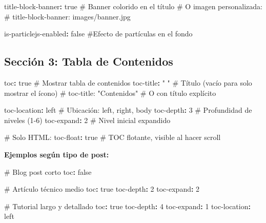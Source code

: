\documentclass[
  doc,
  floatsintext,
  longtable,
  a4paper,
  nolmodern,
  notxfonts,
  notimes,
  12pt,
  colorlinks=true,linkcolor=blue,citecolor=blue,urlcolor=blue]{apa7}
\newenvironment{Shaded}{\begin{snugshade}}{\end{snugshade}}
\newcommand{\AttributeTok}[1]{\textcolor[rgb]{0.40,0.45,0.13}{#1}}
\newcommand{\CharTok}[1]{\textcolor[rgb]{0.13,0.47,0.30}{#1}}
\newcommand{\CommentTok}[1]{\textcolor[rgb]{0.37,0.37,0.37}{#1}}
\newcommand{\DecValTok}[1]{\textcolor[rgb]{0.68,0.00,0.00}{#1}}
\newcommand{\FunctionTok}[1]{\textcolor[rgb]{0.28,0.35,0.67}{#1}}
\newcommand{\KeywordTok}[1]{\textcolor[rgb]{0.00,0.23,0.31}{\textbf{#1}}}
\newcommand{\StringTok}[1]{\textcolor[rgb]{0.13,0.47,0.30}{#1}}
\begin{document}
\begin{Shaded}
\begin{Highlighting}[]
\FunctionTok{title{-}block{-}banner}\KeywordTok{:}\AttributeTok{ }\CharTok{true}\CommentTok{     \# Banner colorido en el título}
\CommentTok{\# O imagen personalizada:}
\CommentTok{\# title{-}block{-}banner: images/banner.jpg}

\FunctionTok{is{-}particlejs{-}enabled}\KeywordTok{:}\AttributeTok{ }\CharTok{false}\CommentTok{ \#Efecto de partículas en el fondo}
\end{Highlighting}
\end{Shaded}

\subsection{Sección 3: Tabla de
Contenidos}\label{secciuxf3n-3-tabla-de-contenidos}

\begin{Shaded}
\begin{Highlighting}[]
\FunctionTok{toc}\KeywordTok{:}\AttributeTok{ }\CharTok{true}\CommentTok{                    \# Mostrar tabla de contenidos}
\FunctionTok{toc{-}title}\KeywordTok{:}\AttributeTok{ }\StringTok{" "}\CommentTok{               \# Título (vacío para solo mostrar el ícono)}
\CommentTok{\# toc{-}title: "Contenidos"    \# O con título explícito}

\FunctionTok{toc{-}location}\KeywordTok{:}\AttributeTok{ left}\CommentTok{           \# Ubicación: left, right, body}
\FunctionTok{toc{-}depth}\KeywordTok{:}\AttributeTok{ }\DecValTok{3}\CommentTok{                 \# Profundidad de niveles (1{-}6)}
\FunctionTok{toc{-}expand}\KeywordTok{:}\AttributeTok{ }\DecValTok{2}\CommentTok{                \# Nivel inicial expandido}

\CommentTok{\# Solo HTML:}
\FunctionTok{toc{-}float}\KeywordTok{:}\AttributeTok{ }\CharTok{true}\CommentTok{              \# TOC flotante, visible al hacer scroll}
\end{Highlighting}
\end{Shaded}

\textbf{Ejemplos según tipo de post:}

\begin{Shaded}
\begin{Highlighting}[]
\CommentTok{\# Blog post corto}
\FunctionTok{toc}\KeywordTok{:}\AttributeTok{ }\CharTok{false}

\CommentTok{\# Artículo técnico medio}
\FunctionTok{toc}\KeywordTok{:}\AttributeTok{ }\CharTok{true}
\FunctionTok{toc{-}depth}\KeywordTok{:}\AttributeTok{ }\DecValTok{2}
\FunctionTok{toc{-}expand}\KeywordTok{:}\AttributeTok{ }\DecValTok{2}

\CommentTok{\# Tutorial largo y detallado}
\FunctionTok{toc}\KeywordTok{:}\AttributeTok{ }\CharTok{true}
\FunctionTok{toc{-}depth}\KeywordTok{:}\AttributeTok{ }\DecValTok{4}
\FunctionTok{toc{-}expand}\KeywordTok{:}\AttributeTok{ }\DecValTok{1}
\FunctionTok{toc{-}location}\KeywordTok{:}\AttributeTok{ left}
\end{Highlighting}
\end{Shaded}
\end{document}
